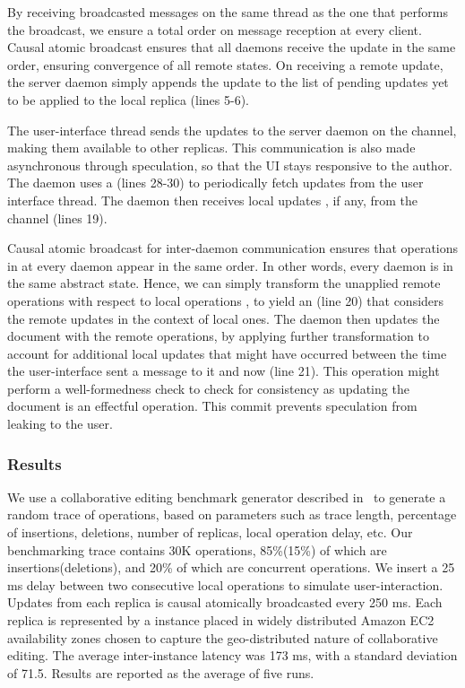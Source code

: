 By receiving broadcasted messages on the same thread as the one that performs
the broadcast, we ensure a total order on message reception at every client.
Causal atomic broadcast ensures that all daemons receive the update in the same
order, ensuring convergence of all remote states. On receiving a remote update,
the server daemon simply appends the update to the list of pending updates yet
to be applied to the local replica (lines 5-6).

The user-interface thread sends the updates to the server daemon on the 
channel, making them available to other replicas. This communication is also
made asynchronous through speculation, so that the UI stays responsive to the
author. The daemon uses a  (lines 28-30) to periodically
fetch updates from the user interface thread. The daemon then receives local
updates , if any, from the channel  (lines 19).

Causal atomic broadcast for inter-daemon communication ensures that operations
in  at every daemon appear in the same order. In other words, every
daemon is in the same abstract state. Hence, we can simply transform the
unapplied remote operations  with respect to local operations
, to yield an  (line 20) that considers the remote updates in
the context of local ones.  The daemon then updates the document with the
remote operations, by applying further transformation to account for additional
local updates that might have occurred between the time the user-interface sent
a message to it and now (line 21). This operation might perform a
well-formedness check to check for consistency as updating the document is an
effectful operation. This commit prevents speculation from leaking to the user.

\subsubsection{Results}

We use a collaborative editing benchmark generator described
in~\cite{MartinAU12} to generate a random trace of operations, based on
parameters such as trace length, percentage of insertions, deletions, number of
replicas, local operation delay, etc. Our benchmarking trace contains 30K
operations, 85\%(15\%) of which are insertions(deletions), and 20\% of which
are concurrent operations. We insert a 25 ms delay between two consecutive
local operations to simulate user-interaction. Updates from each replica is
causal atomically broadcasted every 250 ms. Each replica is represented by a
\rxcml instance placed in widely distributed Amazon EC2 availability zones
chosen to capture the geo-distributed nature of collaborative editing. The
average inter-instance latency was 173 ms, with a standard deviation of 71.5.
Results are reported as the average of five runs.

